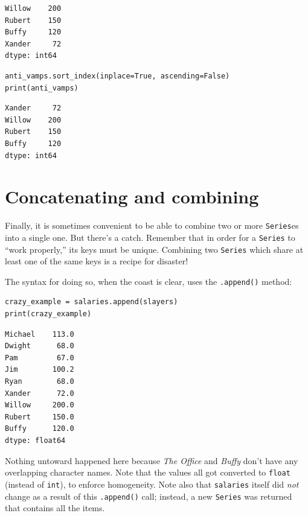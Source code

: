 \begin{Verbatim}[fontsize=\small,samepage=true,frame=leftline,framesep=5mm,framerule=1mm]
Willow    200
Rubert    150
Buffy     120
Xander     72
dtype: int64
\end{Verbatim}

\begin{Verbatim}[fontsize=\small,samepage=true,frame=single,framesep=3mm]
anti_vamps.sort_index(inplace=True, ascending=False)
print(anti_vamps)
\end{Verbatim}
\vspace{-.3in}

\begin{Verbatim}[fontsize=\small,samepage=true,frame=leftline,framesep=5mm,framerule=1mm]
Xander     72
Willow    200
Rubert    150
Buffy     120
dtype: int64
\end{Verbatim}

\section{Concatenating and combining}

Finally, it is sometimes convenient to be able to combine two or more
\texttt{Series}es into a single one. But there's a catch. Remember that in
order for a \texttt{Series} to ``work properly,'' its keys must be unique.
Combining two \texttt{Series} which share at least one of the same keys is a
recipe for disaster!

The syntax for doing so, when the coast is clear, uses the \texttt{.append()}
method:

\begin{Verbatim}[fontsize=\small,samepage=true,frame=single,framesep=3mm]
crazy_example = salaries.append(slayers)
print(crazy_example)
\end{Verbatim}
\vspace{-.3in}

\begin{Verbatim}[fontsize=\small,samepage=true,frame=leftline,framesep=5mm,framerule=1mm]
Michael    113.0
Dwight      68.0
Pam         67.0
Jim        100.2
Ryan        68.0
Xander      72.0
Willow     200.0
Rubert     150.0
Buffy      120.0
dtype: float64
\end{Verbatim}

Nothing untoward happened here because \textit{The Office} and \textit{Buffy}
don't have any overlapping character names. Note that the values all got
converted to \texttt{float} (instead of \texttt{int}), to enforce homogeneity.
Note also that \texttt{salaries} itself did \textit{not} change as a result of
this \texttt{.append()} call; instead, a new \texttt{Series} was returned that
contains all the items.


